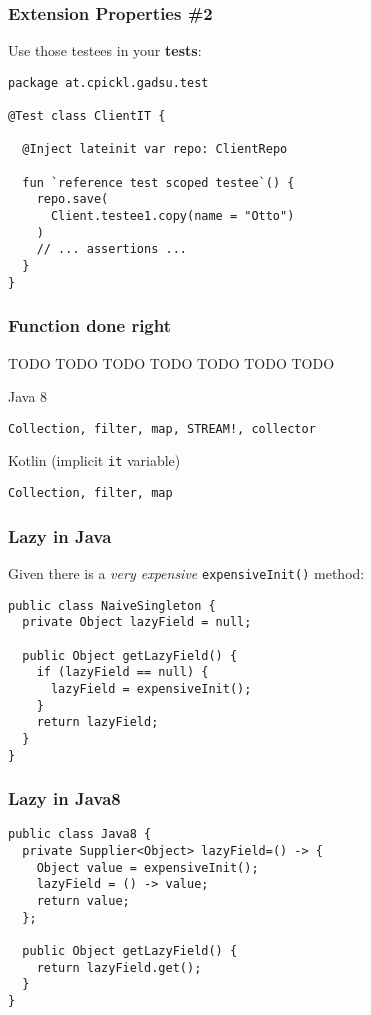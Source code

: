 \begin{frame}[fragile] \frametitle{Extension Properties \#2}
Use those testees in your \textbf{tests}:
\begin{lstlisting}
package at.cpickl.gadsu.test

@Test class ClientIT {

  @Inject lateinit var repo: ClientRepo
  
  fun `reference test scoped testee`() {
    repo.save(
      Client.testee1.copy(name = "Otto")
    )
    // ... assertions ... 
  }
}
\end{lstlisting}
\end{frame}


\begin{frame}[fragile] \frametitle{Function done right}

TODO TODO TODO TODO TODO TODO TODO 

Java 8
\begin{lstlisting}
Collection, filter, map, STREAM!, collector
\end{lstlisting}

Kotlin (implicit \texttt{it} variable)
\begin{lstlisting}
Collection, filter, map
\end{lstlisting}
\end{frame}



\begin{frame}[fragile] \frametitle{Lazy in Java}
Given there is a \textit{very expensive} \texttt{expensiveInit()} method:
\pause
\begin{lstlisting}
public class NaiveSingleton {
  private Object lazyField = null;

  public Object getLazyField() {
    if (lazyField == null) {
      lazyField = expensiveInit();
    }
    return lazyField;
  }
}
\end{lstlisting}
\end{frame}

\begin{frame}[fragile] \frametitle{Lazy in Java8}
\begin{lstlisting}
public class Java8 {
  private Supplier<Object> lazyField=() -> {
    Object value = expensiveInit();
    lazyField = () -> value;
    return value;
  };

  public Object getLazyField() {
    return lazyField.get();
  }
}
\end{lstlisting}
\end{frame}

